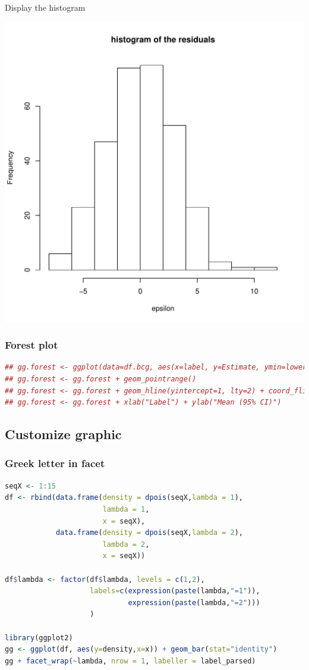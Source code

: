 \documentclass{article}
\begin{document}
Display the histogram
\begin{center}
\includegraphics[width=.9\linewidth]{./figures/fig-hist-residuals.pdf}
\label{}
\end{center}
\subsubsection{Forest plot}
\label{sec:org4be2f6e}
\begin{lstlisting}[language=r,numbers=none]
## gg.forest <- ggplot(data=df.bcg, aes(x=label, y=Estimate, ymin=lower, ymax=upper))
## gg.forest <- gg.forest + geom_pointrange()
## gg.forest <- gg.forest + geom_hline(yintercept=1, lty=2) + coord_flip()
## gg.forest <- gg.forest + xlab("Label") + ylab("Mean (95% CI)") 
\end{lstlisting}
\subsection{Customize graphic}
\label{sec:orgdd745c0}

\subsubsection{Greek letter in facet}
\label{sec:orgfb7fcc1}
\begin{lstlisting}[language=r,numbers=none]
seqX <- 1:15
df <- rbind(data.frame(density = dpois(seqX,lambda = 1),
                       lambda = 1,
                       x = seqX),
            data.frame(density = dpois(seqX,lambda = 2),
                       lambda = 2,
                       x = seqX))

df$lambda <- factor(df$lambda, levels = c(1,2),
                    labels=c(expression(paste(lambda,"=1")),
                             expression(paste(lambda,"=2")))
                    )

library(ggplot2)
gg <- ggplot(df, aes(y=density,x=x)) + geom_bar(stat="identity")
gg + facet_wrap(~lambda, nrow = 1, labeller = label_parsed)

\end{lstlisting}
\end{document}
